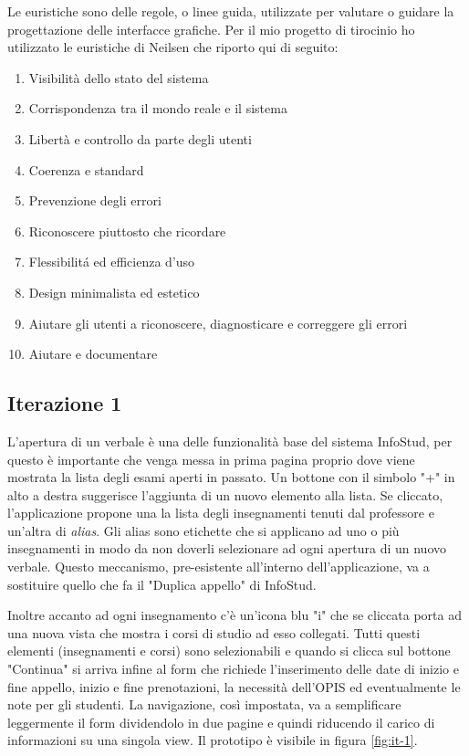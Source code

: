 \documentclass[Lau, oneside, noexaminfo]{sapthesis}%
\begin{document}
Le euristiche sono delle regole, o linee guida, utilizzate per valutare o guidare la progettazione delle interfacce grafiche. Per il mio progetto di tirocinio ho utilizzato le euristiche di Neilsen che riporto qui di seguito:
\begin{enumerate}
	\item Visibilità dello stato del sistema
	\item Corrispondenza tra il mondo reale e il sistema
	\item Libertà e controllo da parte degli utenti
	\item Coerenza e standard
	\item Prevenzione degli errori
	\item Riconoscere piuttosto che ricordare
	\item Flessibilit\'a ed efficienza d'uso 
	\item Design minimalista ed estetico
	\item Aiutare gli utenti a riconoscere, diagnosticare e correggere gli errori
	\item Aiutare e documentare
\end{enumerate}

\subsection{Iterazione 1}
L'apertura di un verbale è una delle funzionalità base del sistema InfoStud, per questo è importante che venga messa in prima pagina proprio dove viene mostrata la lista degli esami aperti in passato. Un bottone con il simbolo "+" in alto a destra suggerisce l'aggiunta di un nuovo elemento alla lista. Se cliccato, l'applicazione propone una la lista degli insegnamenti tenuti dal professore e un'altra di \textit{alias}. Gli alias sono etichette che si applicano ad uno o più insegnamenti in modo da non doverli selezionare ad ogni apertura di un nuovo verbale. Questo meccanismo, pre-esistente all'interno dell'applicazione, va a sostituire quello che fa il "Duplica appello" di InfoStud.

Inoltre accanto ad ogni insegnamento c'è un'icona blu "i" che se cliccata porta ad una nuova vista che mostra i corsi di studio ad esso collegati. Tutti questi elementi (insegnamenti e corsi) sono selezionabili e quando si clicca sul bottone "Continua" si arriva infine al form che richiede l'inserimento delle date di inizio e fine appello, inizio e fine prenotazioni, la necessità dell'OPIS ed eventualmente le note per gli studenti. La navigazione, così impostata, va a semplificare leggermente il form dividendolo in due pagine e quindi riducendo il carico di informazioni su una singola view. Il prototipo è visibile in figura \ref{fig:it-1}.
\end{document}
